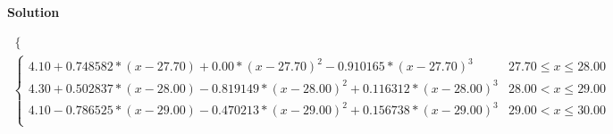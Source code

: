\documentclass[8pt]{article} %
\newenvironment{solution}%
{\par\textbf{Solution}\space }%
{\par}
\begin{document}
\begin{solution}
\begin{enumerate}[label=(\alph*)]
{\begin{gather*}
\begin{cases}
				\end{cases}\\
				\begin{cases}
					4.10+0.748582*(x-27.70)+0.00*(x-27.70)^2-0.910165*(x-27.70)^3&  27.70\leq x\leq 28.00\\
					4.30+0.502837*(x-28.00)-0.819149*(x-28.00)^2+0.116312*(x-28.00)^3&  28.00<x\leq 29.00\\
					4.10-0.786525*(x-29.00)-0.470213*(x-29.00)^2+0.156738*(x-29.00)^3&  29.00<x\leq 30.00\\
				\end{cases}
			\end{gather*}
			}
	\end{enumerate}
\end{solution}
\end{document}

